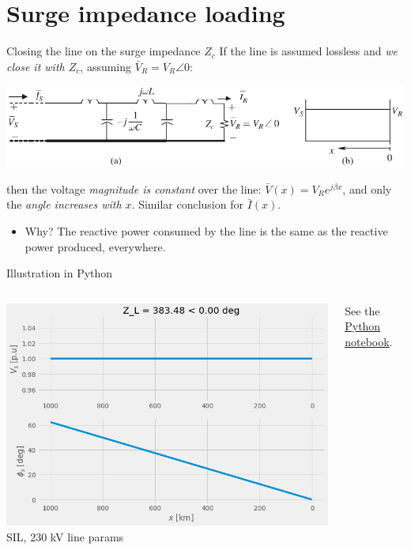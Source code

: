 \section{Surge impedance loading}
\begin{frame}{Closing the line on the surge impedance $Z_c$}
    If the line is assumed lossless and \textit{we close it with $Z_c$}, assuming $\bar{V}_R = V_R \angle 0$:
    \begin{center}
        \includegraphics[width=\textwidth]{images/SIL.png}
    \end{center}
    then the voltage \textit{magnitude is constant} over the line: $\bar{V}(x) = V_R e^{j\beta x}$, and only the \textit{angle increases with $x$}.
    Similar conclusion for $\bar{I}(x)$.
    \begin{itemize}
        \item Why? The reactive power consumed by the line is the same as the reactive power produced, everywhere.
    \end{itemize}
\end{frame}

\begin{frame}{Illustration in Python}
\begin{columns}
    \begin{column}{0.55\textwidth}
    \begin{center}
        \includegraphics[width=\textwidth]{images/line_model_voltage.png}
        \small{SIL, 230 kV line params}
    \end{center}
    \end{column}
    \begin{column}{0.4\textwidth}
    See the \href{https://colab.research.google.com/drive/1FDHjHhW1a6JECWwfznBeP2T5-M9UaJn8?usp=sharing}{\underline{Python notebook}}.
    \end{column}
\end{columns}

\end{frame}

